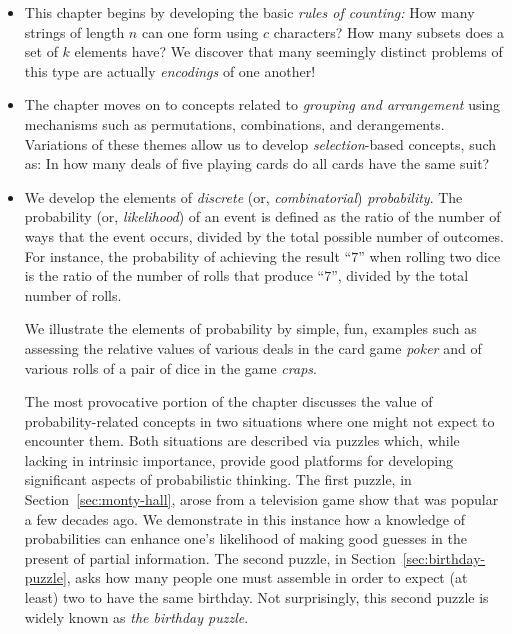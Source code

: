 \begin{itemize}
\item
This chapter begins by developing the basic {\em rules of counting:}  How many strings of length $n$ can one form using $c$ characters?  How many subsets does a set of $k$ elements have?  We discover that many seemingly distinct problems of this type are actually {\em encodings} of one another!

\medskip\item
The chapter moves on to concepts related to {\em grouping and arrangement} using mechanisms such as permutations, combinations, and derangements.  Variations of these themes allow us to develop {\em selection}-based concepts, such as: In how many deals of five playing cards do all cards have the same suit?

\medskip\item
We develop the elements of {\em discrete} (or, {\em combinatorial}) {\em probability}.  The probability (or, {\it likelihood}) of an event is defined as the ratio of the number of ways that the event occurs, divided by the total possible number of outcomes.  For instance, the probability of achieving the result ``$7$'' when rolling two dice is the ratio of the number of rolls that produce ``$7$'', divided by the total number of rolls.

\smallskip

We illustrate the elements of probability by simple, fun, examples such as assessing the relative values of various deals in the card game {\it poker} and of various rolls of a pair of dice in the game {\it craps}.

\smallskip

The most provocative portion of the chapter discusses the value of probability-related concepts in two situations where one might not expect to encounter them.  Both situations are described via puzzles which, while lacking in intrinsic importance, provide good platforms for developing significant aspects of probabilistic thinking.  The first puzzle, in Section~\ref{sec:monty-hall}, arose from a television game show that was popular a few decades ago.  We demonstrate in this
instance how a knowledge of probabilities can enhance one's likelihood of making good guesses in the present of partial information.  The second puzzle, in Section~\ref{sec:birthday-puzzle}, asks how many people one must assemble in order to expect (at least) two to have the same birthday. Not surprisingly, this second puzzle is widely known as {\it the birthday puzzle}.


\end{itemize}
